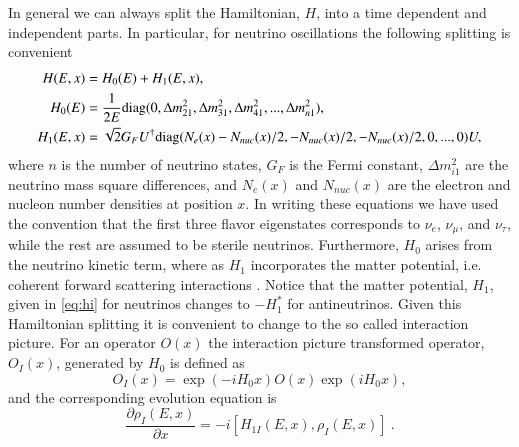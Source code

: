 \documentclass[3p,12pt]{elsarticle}
\newcommand{\pa}[2]{\frac{\partial #1}{\partial #2}}
\begin{document}
In general we can always split the Hamiltonian, $H$, into a time dependent and independent parts. In particular, for neutrino oscillations the following splitting is convenient
\begin{subequations}
\label{eq:hamiltonian}
\begin{align}
H(E,x) &= H_0(E)  + H_{1}(E,x) ,\\
H_0 (E) &= \frac{1}{2E} {\rm diag}( 0 , \Delta m^2_{21},\Delta m^2_{31},\Delta m^2_{41},...,\Delta m^2_{n1}) \label{eq:h0} ,\\
H_1 (E,x) &= \sqrt{2} G_F U^\dagger {\rm diag} ( N_e(x) -
N_{nuc}(x)/2, -N_{nuc}(x)/2, -N_{nuc}(x)/2 , 0,...,0 )U ,\label{eq:hi} 
\end{align}
\end{subequations}
where $n$ is the number of neutrino states, $G_F$ is the Fermi
constant, $\Delta m^2_{i1}$ are the neutrino mass square differences,
and $N_e(x)$ and $N_{nuc}(x)$ are the electron and nucleon number
densities at position $x$. 
 In writing these equations we have used the
convention that the first three flavor eigenstates corresponds to
$\nu_e$, $\nu_\mu$, and $\nu_\tau$, while the rest are assumed to be
sterile neutrinos. Furthermore, $H_0$ arises from the neutrino kinetic
term, where as $H_1$ incorporates the matter potential, i.e. coherent
forward scattering interactions
\citep{Mikheev:1986gs,Mikheev:1986wj,Wolfenstein:1977ue}. Notice that the matter
potential, $H_1$, given in \eqref{eq:hi} for neutrinos changes to
$-H_1^*$ for antineutrinos. 
Given this Hamiltonian splitting it is convenient to change to the so
called interaction picture. For an operator $O(x)$ the interaction picture transformed
operator, $O_I(x)$, generated by $H_0$ is defined as
\begin{equation}
O_I(x)=\exp(-iH_0x)O(x)\exp(iH_0x),
\end{equation}
and the corresponding evolution equation is
\begin{equation}
\pa{\rho_I(E,x)}{x} = -i [ H_{1I} (E,x), \rho_I(E,x) ]~.
\label{eq:schrodinger_int}
\end{equation}
\end{document}
